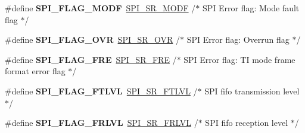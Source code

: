 \begin{DoxyCompactItemize}
\#define {\bfseries S\+P\+I\+\_\+\+F\+L\+A\+G\+\_\+\+M\+O\+DF}~\mbox{\hyperlink{group___peripheral___registers___bits___definition_gabaa043349833dc7b8138969c64f63adf}{S\+P\+I\+\_\+\+S\+R\+\_\+\+M\+O\+DF}}   /$\ast$ S\+PI Error flag\+: Mode fault flag                 $\ast$/
\item 
\mbox{\label{group___s_p_i___flags__definition_gab45264da2296c75495a7437a045513ea}} 
\#define {\bfseries S\+P\+I\+\_\+\+F\+L\+A\+G\+\_\+\+O\+VR}~\mbox{\hyperlink{group___peripheral___registers___bits___definition_gaa8d902302c5eb81ce4a57029de281232}{S\+P\+I\+\_\+\+S\+R\+\_\+\+O\+VR}}    /$\ast$ S\+PI Error flag\+: Overrun flag                    $\ast$/
\item 
\mbox{\label{group___s_p_i___flags__definition_ga27dd114d8adc70f1439c054289f9313a}} 
\#define {\bfseries S\+P\+I\+\_\+\+F\+L\+A\+G\+\_\+\+F\+RE}~\mbox{\hyperlink{group___peripheral___registers___bits___definition_gace2c7cac9431231663af42e6f5aabce6}{S\+P\+I\+\_\+\+S\+R\+\_\+\+F\+RE}}    /$\ast$ S\+PI Error flag\+: TI mode frame format error flag $\ast$/
\item 
\mbox{\label{group___s_p_i___flags__definition_gac8148197385a872c6f996a78928d1c20}} 
\#define {\bfseries S\+P\+I\+\_\+\+F\+L\+A\+G\+\_\+\+F\+T\+L\+VL}~\mbox{\hyperlink{group___peripheral___registers___bits___definition_ga17880f1e186033ebc6917c008a623371}{S\+P\+I\+\_\+\+S\+R\+\_\+\+F\+T\+L\+VL}}  /$\ast$ S\+PI fifo transmission level                     $\ast$/
\item 
\mbox{\label{group___s_p_i___flags__definition_ga4406c904711e73f41bfbc930bfc92d58}} 
\#define {\bfseries S\+P\+I\+\_\+\+F\+L\+A\+G\+\_\+\+F\+R\+L\+VL}~\mbox{\hyperlink{group___peripheral___registers___bits___definition_ga60df84101c523802832c4d1a2895d665}{S\+P\+I\+\_\+\+S\+R\+\_\+\+F\+R\+L\+VL}}  /$\ast$ S\+PI fifo reception level                        $\ast$/
\item 
\mbox{\label{group___s_p_i___flags__definition_ga1b2ed6861d967c5bc45a7e7c9101d33c}} 

\end{DoxyCompactItemize}
